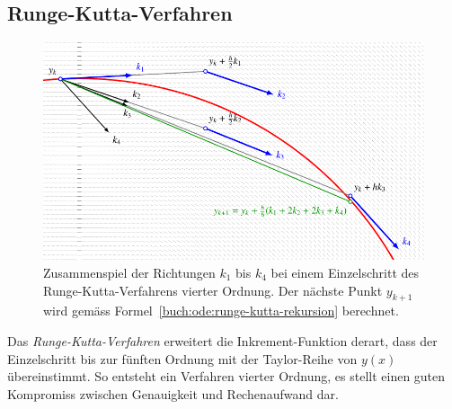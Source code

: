 \subsection{Runge-Kutta-Verfahren\label{subsection:buch:ode:runge-kutta}}
%
\begin{figure}
\centering
\includegraphics{chapters/50-ode/figures/rungekutta.pdf}
\caption{Zusammenspiel der Richtungen $k_1$ bis $k_4$ bei einem
Einzelschritt des Runge-Kutta-Verfahrens vierter Ordnung.
Der nächste Punkt $y_{k+1}$ wird gemäss
Formel~\eqref{buch:ode:runge-kutta-rekursion} berechnet.
\label{buch:ode:rk-step}}
\end{figure}
Das {\em Runge-Kutta-Verfahren} erweitert die Inkrement-Funktion derart,
dass der Einzelschritt bis zur fünften Ordnung mit der Taylor-Reihe von
$y(x)$ übereinstimmt.
So entsteht ein Verfahren vierter Ordnung, es stellt einen guten Kompromiss
zwischen Genauigkeit und Rechenaufwand dar.


